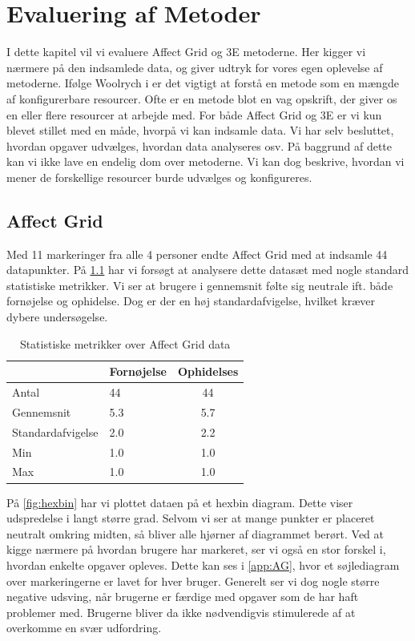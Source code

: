 \chapter{Evaluering af Metoder}\label{ch:evalmet}
I dette kapitel vil vi evaluere Affect Grid og 3E metoderne. Her kigger vi nærmere på den indsamlede data, og giver udtryk for vores egen oplevelse af metoderne. Ifølge Woolrych i \cite{Woolrych} er det vigtigt at forstå en metode som en mængde af konfigurerbare resourcer. Ofte er en metode blot en vag opskrift, der giver os en eller flere resourcer at arbejde med. For både Affect Grid og 3E er vi kun blevet stillet med en måde, hvorpå vi kan indsamle data. Vi har selv besluttet, hvordan opgaver udvælges, hvordan data analyseres osv. På baggrund af dette kan vi ikke lave en endelig dom over metoderne. Vi kan dog beskrive, hvordan vi mener de forskellige resourcer burde udvælges og konfigureres.

\section{Affect Grid}\label{sec:evalAG}
Med 11 markeringer fra alle 4 personer endte Affect Grid med at indsamle 44 datapunkter. På \cref{tab:AG} har vi forsøgt at analysere dette datasæt med nogle standard statistiske metrikker. Vi ser at brugere i gennemsnit følte sig neutrale ift. både fornøjelse og ophidelse. Dog er der en høj standardafvigelse, hvilket kræver dybere undersøgelse.  

\begin{table}[]
\centering
\caption{Statistiske metrikker over Affect Grid data}
\label{tab:AG}
\begin{tabular}{|l|l|c|}
\hline
                  & Fornøjelse & Ophidelses               \\ \hline
Antal             & 44         & 44                       \\ \hline
Gennemsnit        & 5.3        & 5.7                      \\ \hline
Standardafvigelse & 2.0        & 2.2                      \\ \hline
Min               & 1.0        & 1.0 \\ \hline
Max               & 1.0        & 1.0 \\ \hline
\end{tabular}
\end{table}

På \cref{fig:hexbin} har vi plottet dataen på et hexbin diagram. Dette viser udspredelse i langt større grad. Selvom vi ser at mange punkter er placeret neutralt omkring midten, så bliver alle hjørner af diagrammet berørt. Ved at kigge nærmere på hvordan brugere har markeret, ser vi også en stor forskel i, hvordan enkelte opgaver opleves. Dette kan ses i \cref{app:AG}, hvor et søjlediagram over markeringerne er lavet for hver bruger. Generelt ser vi dog nogle større negative udsving, når brugerne er færdige med opgaver som de har haft problemer med. Brugerne bliver da ikke nødvendigvis stimulerede af at overkomme en svær udfordring. 

